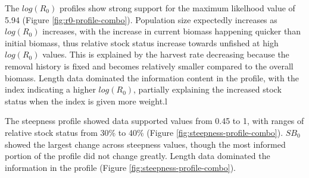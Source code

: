 \documentclass[11pt,
  english,
  a4paper,
]{article}
\begin{document}
\leavevmode\tagmcend\tagstructend\par


The {\(log(R_0)\)\leavevmode\tagmcend\tagstructend} profiles show strong support for the maximum likelhood value of 5.94 (Figure \ref{fig:r0-profile-combo}). Population size expectedly increases as {\(log(R_0)\)\leavevmode\tagmcend\tagstructend} increases, with the increase in current biomass happening quicker than initial biomass, thus relative stock status increase towards unfished at high {\(log(R_0)\)\leavevmode\tagmcend\tagstructend} values. This is explained by the harvest rate decreasing because the removal history is fixed and becomes relatively smaller compared to the overall biomass. Length data dominated the information content in the profile, with the index indicating a higher {\(log(R_0)\)\leavevmode\tagmcend\tagstructend}, partially explaining the increased stock status when the index is given more weight.l

\leavevmode\tagmcend\tagstructend\par


The steepness profile showed data supported values from 0.45 to 1, with ranges of relative stock status from 30\% to 40\% (Figure \ref{fig:steepness-profile-combo}). {\(SB_0\)\leavevmode\tagmcend\tagstructend} showed the largest change across steepness values, though the most informed portion of the profile did not change greatly. Length data dominated the information in the profile (Figure \ref{fig:steepness-profile-combo}).

\leavevmode\tagmcend\tagstructend\par

\end{document}
